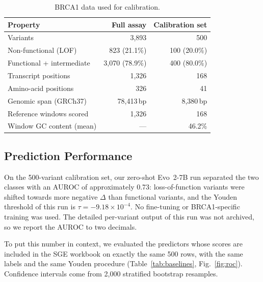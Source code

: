 \documentclass[conference,a4paper]{IEEEtran}
\begin{document}
\begin{table}[!t]
\caption{BRCA1 data used for calibration.}
\label{tab:slice}
\centering
\footnotesize
\begin{tabular}{@{}lrr@{}}
\toprule
Property & Full assay & Calibration set \\
\midrule
Variants & 3{,}893 & 500 \\
Non-functional (LOF) & 823 (21.1\%) & 100 (20.0\%) \\
Functional + intermediate & 3{,}070 (78.9\%) & 400 (80.0\%) \\
Transcript positions & 1{,}326 & 168 \\
Amino-acid positions & 326 & 41 \\
Genomic span (GRCh37) & 78{,}413\,bp & 8{,}380\,bp \\
Reference windows scored & 1{,}326 & 168 \\
Window GC content (mean) & --- & 46.2\% \\
\bottomrule
\end{tabular}
\end{table}

\subsection{Prediction Performance}
On the 500-variant calibration set, our zero-shot Evo~2-7B run separated the two classes with an AUROC of approximately 0.73: loss-of-function variants were shifted towards more negative $\Delta$ than functional variants, and the Youden threshold of this run is $\tau=-9.18\times10^{-4}$. No fine-tuning or BRCA1-specific training was used. The detailed per-variant output of this run was not archived, so we report the AUROC to two decimals.

To put this number in context, we evaluated the predictors whose scores are included in the SGE workbook on exactly the same 500 rows, with the same labels and the same Youden procedure (Table~\ref{tab:baselines}, Fig.~\ref{fig:roc}). Confidence intervals come from 2{,}000 stratified bootstrap resamples.
\end{document}
